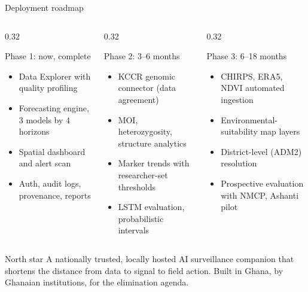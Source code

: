 \documentclass[aspectratio=169,11pt]{beamer}
\begin{document}
\begin{frame}{Deployment roadmap}
  \begin{columns}[c]
    \begin{column}{0.32\textwidth}
      \begin{block}{Phase 1: now, complete}
        \begin{itemize}\scriptsize
          \item Data Explorer with quality profiling
          \item Forecasting engine, 3 models by 4 horizons
          \item Spatial dashboard and alert scan
          \item Auth, audit logs, provenance, reports
        \end{itemize}
      \end{block}
    \end{column}
    \begin{column}{0.32\textwidth}
      \begin{alertblock}{Phase 2: 3--6 months}
        \begin{itemize}\scriptsize
          \item KCCR genomic connector (data agreement)
          \item MOI, heterozygosity, structure analytics
          \item Marker trends with researcher-set thresholds
          \item LSTM evaluation, probabilistic intervals
        \end{itemize}
      \end{alertblock}
    \end{column}
    \begin{column}{0.32\textwidth}
      \begin{block}{Phase 3: 6--18 months}
        \begin{itemize}\scriptsize
          \item CHIRPS, ERA5, NDVI automated ingestion
          \item Environmental-suitability map layers
          \item District-level (ADM2) resolution
          \item Prospective evaluation with NMCP, Ashanti pilot
        \end{itemize}
      \end{block}
    \end{column}
  \end{columns}
  \vspace{2mm}
  \begin{exampleblock}{North star}
    A nationally trusted, locally hosted AI surveillance companion that
    shortens the distance from data to signal to field action. Built in Ghana,
    by Ghanaian institutions, for the elimination agenda.
  \end{exampleblock}
\end{frame}
\end{document}
